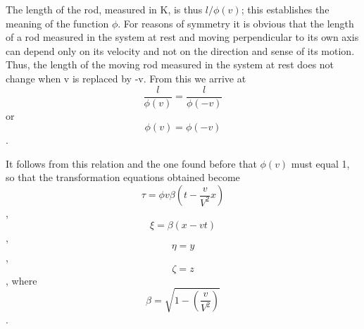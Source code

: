 ﻿\documentclass{article} %
\begin{document}
The length of the rod, measured in K, is thus $l/\phi(v)$; this establishes the meaning of the function $\phi$. 
For reasons of symmetry it is obvious that the length of a rod measured in the system at rest and moving perpendicular to its own axis can depend only on its velocity and not on the direction and sense of its motion. 
Thus, the length of the moving rod measured in the system at rest does not change when v is replaced by -v. 
From this we arrive at
\begin{equation} \frac{l}{\phi(v)}=\frac{l}{\phi(-v)}\nonumber\end{equation}
or
\begin{equation} \phi(v)=\phi(-v)\nonumber\end{equation}.

It follows from this relation and the one found before that $\phi(v)$ must equal 1, so that the transformation equations obtained become
\begin{equation} \tau=\phi{v}\beta\left(t-\frac{v}{V^2}x\right) \nonumber\end{equation},
\begin{equation} \xi=\beta\left(x-vt\right) \nonumber\end{equation},
\begin{equation} \eta=y \nonumber\end{equation},
\begin{equation} \zeta=z \nonumber\end{equation},
where
\begin{equation} \beta=\sqrt{1-\left(\frac{v}{V^2}\right)} \nonumber\end{equation}.
\end{document}
